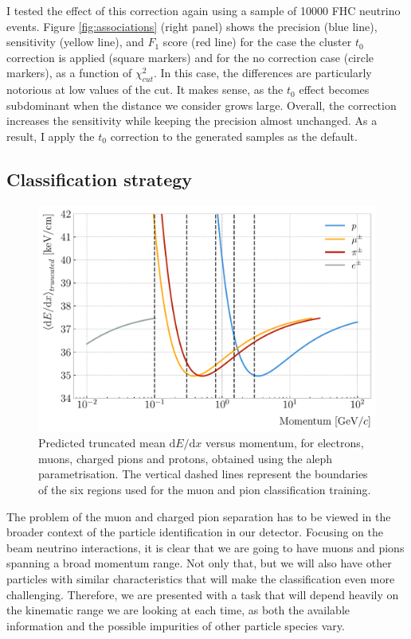 I tested the effect of this correction again using a sample of 10000 FHC neutrino events. Figure \ref{fig:associations} (right panel) shows the precision (blue line), sensitivity (yellow line), and $F_{1}$ score (red line) for the case the cluster $t_{0}$ correction is applied (square markers) and for the no correction case (circle markers), as a function of $\chi^{2}_{cut}$. In this case, the differences are particularly notorious at low values of the cut. It makes sense, as the $t_{0}$ effect becomes subdominant when the distance we consider grows large. Overall, the correction increases the sensitivity while keeping the precision almost unchanged. As a result, I apply the $t_{0}$ correction to the generated samples as the default.

\subsection{Classification strategy}

\begin{figure}[t]
	\centering
	\includegraphics[width=.80\linewidth]{Images/GArSoft_PID/BDT/dEdx_fit_only.pdf}
	\caption{Predicted truncated mean $\mathrm{d}E/\mathrm{d}x$ versus momentum, for electrons, muons, charged pions and protons, obtained using the \gls{aleph} parametrisation. The vertical dashed lines represent the boundaries of the six regions used for the muon and pion classification training.}
	\label{fig:dEdx_vs_momentum_regions}
\end{figure}

The problem of the muon and charged pion separation has to be viewed in the broader context of the particle identification in our detector. Focusing on the beam neutrino interactions, it is clear that we are going to have muons and pions spanning a broad momentum range. Not only that, but we will also have other particles with similar characteristics that will make the classification even more challenging. Therefore, we are presented with a task that will depend heavily on the kinematic range we are looking at each time, as both the available information and the possible impurities of other particle species vary.

